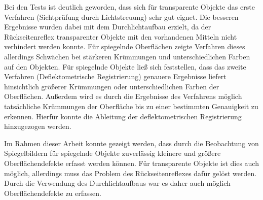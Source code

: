 %
Bei den Tests ist deutlich geworden, dass sich für transparente Objekte das erste Verfahren (Sichtprüfung durch Lichtstreuung) sehr gut eignet.
Die besseren Ergebnisse wurden dabei mit dem Durchlichtaufbau erzielt, da der Rückseitenreflex transparenter Objekte mit den vorhandenen Mitteln nicht verhindert werden konnte.
Für spiegelnde Oberflächen zeigte Verfahren dieses allerdings Schwächen bei stärkeren Krümmungen und unterschiedlichen Farben auf den Objekten.
Für spiegelnde Objekte ließ sich feststellen, dass das zweite Verfahren (Deflektometrische Registrierung) genauere Ergebnisse liefert hinsichtlich größerer Krümmungen oder unterschiedlichen Farben der Oberflächen.
Außerdem wird es durch die Ergebnisse des Verfahrens möglich tatsächliche Krümmungen der Oberfläche bis zu einer bestimmten Genauigkeit zu erkennen. Hierfür konnte die Ableitung der deflektometrischen Registrierung hinzugezogen werden.

\p
Im Rahmen dieser Arbeit konnte gezeigt werden, dass durch die Beobachtung von Spiegelbildern für spiegelnde Objekte zuverlässig kleinere und größere Oberflächendefekte erfasst werden können.
Für transparente Objekte ist dies auch möglich, allerdings muss das Problem des Rückseitenreflexes dafür gelöst werden. 
Durch die Verwendung des Durchlichtaufbaus war es daher auch möglich Oberflächendefekte zu erfassen.